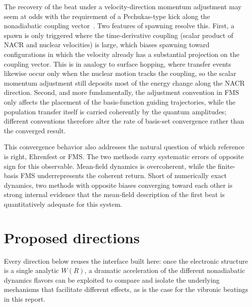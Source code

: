 \documentclass[11pt]{article}
\begin{document}
The recovery of the beat under a velocity-direction momentum adjustment may seem at odds with the requirement of a Pechukas-type kick along the nonadiabatic coupling vector~\cite{negrin2023vibrational}. Two features of spawning resolve this. First, a spawn is only triggered where the time-derivative coupling (scalar product of NACR and nuclear velocities) is large, which biases spawning toward configurations in which the velocity already has a substantial projection on the coupling vector. This is in analogy to surface hopping, where transfer events likewise occur only when the nuclear motion tracks the coupling, so the scalar momentum adjustment still deposits most of the energy change along the NACR direction. Second, and more fundamentally, the adjustment convention in FMS only affects the placement of the basis-function guiding trajectories, while the population transfer itself is carried coherently by the quantum amplitudes; different conventions therefore alter the rate of basis-set convergence rather than the converged result.

This convergence behavior also addresses the natural question of which reference is right, Ehrenfest or FMS. The two methods carry systematic errors of opposite sign for this observable. Mean-field dynamics is overcoherent, while the finite-basis FMS underrepresents the coherent return. Short of numerically exact dynamics, two methods with opposite biases converging toward each other is strong internal evidence that the mean-field description of the first beat is quantitatively adequate for this system.

\section{Proposed directions}
Every direction below reuses the interface built here: once the electronic structure is a single analytic $W(R)$, a dramatic acceleration of the different nonadiabatic dynamics flavors can be exploited to compare and isolate the underlying mechanisms that facilitate different effects, as is the case for the vibronic beatings in this report.
\end{document}
